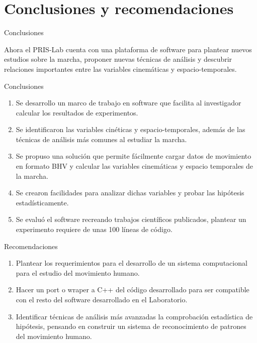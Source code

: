 \documentclass{beamer} %
\begin{document}
\section{Conclusiones y recomendaciones}

\begin{frame}{Conclusiones}
    \begin{block}{}
        Ahora el PRIS-Lab cuenta con una plataforma de software para plantear nuevos estudios sobre la marcha, proponer nuevas técnicas de análisis y descubrir relaciones importantes entre las variables cinemáticas y espacio-temporales. 
    \end{block}
\end{frame}

\begin{frame}{Conclusiones}
    \begin{enumerate}
        \item Se desarrollo un marco de trabajo en software que facilita al investigador calcular los resultados de experimentos. 
        \item Se identificaron las variables cinéticas y espacio-temporales, además de las técnicas de análisis más comunes al estudiar la marcha. 
        \item Se propuso una solución que permite fácilmente cargar datos de movimiento en formato BHV y calcular las variables cinemáticas y espacio temporales de la marcha.
        \item Se crearon facilidades para analizar dichas variables y probar las hipótesis estadísticamente. 
        \item Se evaluó el software recreando trabajos científicos publicados, plantear un experimento requiere de unas 100 líneas de código.
    \end{enumerate}
\end{frame}

\begin{frame}{Recomendaciones}
    \begin{enumerate}
        \item Plantear los requerimientos para el desarrollo de un sistema computacional para el estudio del movimiento humano. 
        \item Hacer un port o wraper a C++ del código desarrollado para ser compatible con el resto del software desarrollado en el Laboratorio. 
        \item Identificar técnicas de análisis más avanzadas la comprobación estadística de hipótesis, pensando en construir un sistema de reconocimiento de patrones del movimiento humano. 
    \end{enumerate}
\end{frame}


\end{document}

